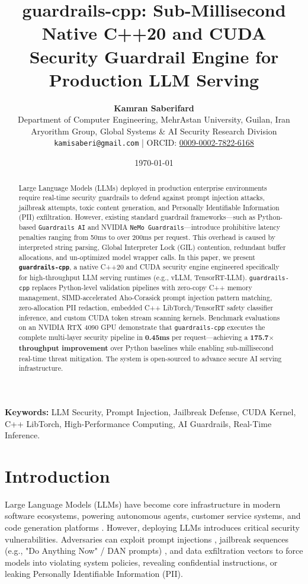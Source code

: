 \documentclass[11pt,onecolumn,a4paper]{article}
\title{\textbf{guardrails-cpp: Sub-Millisecond Native C++20 and CUDA Security Guardrail Engine for Production LLM Serving}}
\author{
    \textbf{Kamran Saberifard}\\[0.5em]
    \small Department of Computer Engineering, MehrAstan University, Guilan, Iran\\
    \small Aryorithm Group, Global Systems \& AI Security Research Division\\
    \small \texttt{kamisaberi@gmail.com} | ORCID: \href{https://orcid.org/0009-0002-7822-6168}{0009-0002-7822-6168}
}
\date{\today}
\begin{document}
\maketitle

\begin{abstract}
Large Language Models (LLMs) deployed in production enterprise environments require real-time security guardrails to defend against prompt injection attacks, jailbreak attempts, toxic content generation, and Personally Identifiable Information (PII) exfiltration. However, existing standard guardrail frameworks—such as Python-based \texttt{Guardrails AI} and NVIDIA \texttt{NeMo Guardrails}—introduce prohibitive latency penalties ranging from 50ms to over 200ms per request. This overhead is caused by interpreted string parsing, Global Interpreter Lock (GIL) contention, redundant buffer allocations, and un-optimized model wrapper calls. In this paper, we present \textbf{\texttt{guardrails-cpp}}, a native C++20 and CUDA security engine engineered specifically for high-throughput LLM serving runtimes (e.g., vLLM, TensorRT-LLM). \texttt{guardrails-cpp} replaces Python-level validation pipelines with zero-copy C++ memory management, SIMD-accelerated Aho-Corasick prompt injection pattern matching, zero-allocation PII redaction, embedded C++ LibTorch/TensorRT safety classifier inference, and custom CUDA token stream scanning kernels. Benchmark evaluations on an NVIDIA RTX 4090 GPU demonstrate that \texttt{guardrails-cpp} executes the complete multi-layer security pipeline in \textbf{0.45ms} per request—achieving a \textbf{175.7$\times$ throughput improvement} over Python baselines while enabling sub-millisecond real-time threat mitigation. The system is open-sourced to advance secure AI serving infrastructure.
\end{abstract}

\textbf{Keywords:} LLM Security, Prompt Injection, Jailbreak Defense, CUDA Kernel, C++ LibTorch, High-Performance Computing, AI Guardrails, Real-Time Inference.

\hrulefill

\section{Introduction}
Large Language Models (LLMs) have become core infrastructure in modern software ecosystems, powering autonomous agents, customer service systems, and code generation platforms \cite{zhao2023survey}. However, deploying LLMs introduces critical security vulnerabilities. Adversaries can exploit prompt injections \cite{perez2022ignore}, jailbreak sequences (e.g., "Do Anything Now" / DAN prompts) \cite{shen2023do}, and data exfiltration vectors to force models into violating system policies, revealing confidential instructions, or leaking Personally Identifiable Information (PII).
\end{document}
